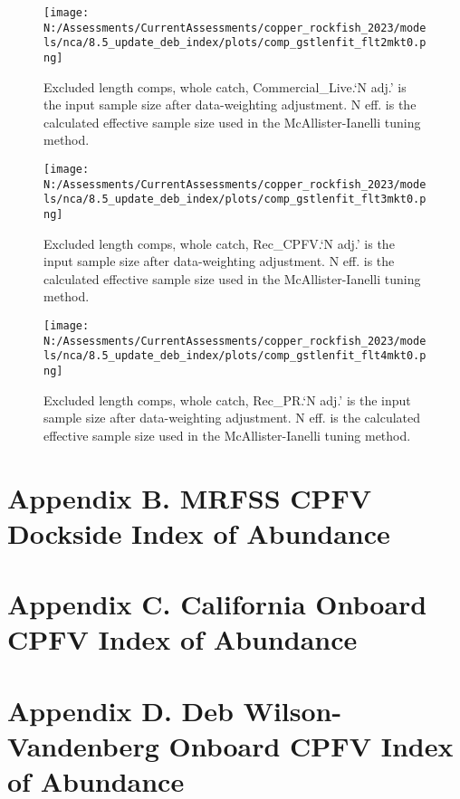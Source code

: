 \documentclass[11pt,
  english,
  letterpaper,
]{article}
\begin{document}
\begin{figure}
\centering
\texttt{[image: N:/Assessments/CurrentAssessments/copper\_rockfish\_2023/models/nca/8.5\_update\_deb\_index/plots/comp\_gstlenfit\_flt2mkt0.png]}
\caption{Excluded length comps, whole catch, Commercial\_Live.`N adj.' is the input sample size after data-weighting adjustment. N eff. is the calculated effective sample size used in the McAllister-Ianelli tuning method.\label{fig:comp_gstlenfit_flt2mkt0}}
\end{figure}

\begin{figure}
\centering
\texttt{[image: N:/Assessments/CurrentAssessments/copper\_rockfish\_2023/models/nca/8.5\_update\_deb\_index/plots/comp\_gstlenfit\_flt3mkt0.png]}
\caption{Excluded length comps, whole catch, Rec\_CPFV.`N adj.' is the input sample size after data-weighting adjustment. N eff. is the calculated effective sample size used in the McAllister-Ianelli tuning method.\label{fig:comp_gstlenfit_flt3mkt0}}
\end{figure}

\begin{figure}
\centering
\texttt{[image: N:/Assessments/CurrentAssessments/copper\_rockfish\_2023/models/nca/8.5\_update\_deb\_index/plots/comp\_gstlenfit\_flt4mkt0.png]}
\caption{Excluded length comps, whole catch, Rec\_PR.`N adj.' is the input sample size after data-weighting adjustment. N eff. is the calculated effective sample size used in the McAllister-Ianelli tuning method.\label{fig:comp_gstlenfit_flt4mkt0}}
\end{figure}

\newpage

\hypertarget{mrfss-cpfv-index}{%
\section{Appendix B. MRFSS CPFV Dockside Index of Abundance}\label{mrfss-cpfv-index}}

\hypertarget{onboard-cpfv-index}{%
\section{Appendix C. California Onboard CPFV Index of Abundance}\label{onboard-cpfv-index}}

\hypertarget{dwv-cpfv-index}{%
\section{Appendix D. Deb Wilson-Vandenberg Onboard CPFV Index of Abundance}\label{dwv-cpfv-index}}
\end{document}
